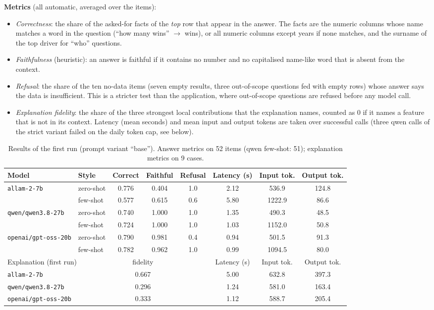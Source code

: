 \documentclass[10pt,a4paper]{article}
\newcommand{\code}[1]{\texttt{#1}}
\begin{document}
\textbf{Metrics} (all automatic, averaged over the items):
\begin{itemize}
\item \emph{Correctness}: the share of the asked-for facts of the \emph{top} row that appear in the answer. The facts are the numeric columns whose name matches a word in the question (``how many wins'' $\rightarrow$ wins), or all numeric columns except years if none matches, and the surname of the top driver for ``who'' questions.
\item \emph{Faithfulness} (heuristic): an answer is faithful if it contains no number and no capitalised name-like word that is absent from the context.
\item \emph{Refusal}: the share of the ten no-data items (seven empty results, three out-of-scope questions fed with empty rows) whose answer says the data is insufficient. This is a stricter test than the application, where out-of-scope questions are refused before any model call.
\item \emph{Explanation fidelity}: the share of the three strongest local contributions that the explanation names, counted as 0 if it names a feature that is not in its context. Latency (mean seconds) and mean input and output tokens are taken over successful calls (three qwen calls of the strict variant failed on the daily token cap, see below).
\end{itemize}

\begin{table}[H]
\centering\small
\caption{Results of the first run (prompt variant ``base''). Answer metrics on 52 items (qwen few-shot: 51); explanation metrics on 9 cases.}\label{tab:llm}
\begin{tabular}{llcccccc}
\toprule
Model & Style & Correct & Faithful & Refusal & Latency (s) & Input tok. & Output tok. \\
\midrule
\code{allam-2-7b} & zero-shot & 0.776 & 0.404 & 1.0 & 2.12 & 536.9 & 124.8 \\
 & few-shot & 0.577 & 0.615 & 0.6 & 5.80 & 1222.9 & 86.6 \\
\code{qwen/qwen3.8-27b} & zero-shot & 0.740 & 1.000 & 1.0 & 1.35 & 490.3 & 48.5 \\
 & few-shot & 0.724 & 1.000 & 1.0 & 1.03 & 1152.0 & 50.8 \\
\code{openai/gpt-oss-20b} & zero-shot & 0.790 & 0.981 & 0.4 & 0.94 & 501.5 & 91.3 \\
 & few-shot & 0.782 & 0.962 & 1.0 & 0.99 & 1094.5 & 80.0 \\
\midrule
\multicolumn{2}{l}{Explanation (first run)} & \multicolumn{2}{c}{fidelity} & & Latency (s) & Input tok. & Output tok. \\
\code{allam-2-7b} & & \multicolumn{2}{c}{0.667} & & 5.00 & 632.8 & 397.3 \\
\code{qwen/qwen3.8-27b} & & \multicolumn{2}{c}{0.296} & & 1.24 & 581.0 & 163.4 \\
\code{openai/gpt-oss-20b} & & \multicolumn{2}{c}{0.333} & & 1.12 & 588.7 & 205.4 \\
\bottomrule
\end{tabular}
\end{table}
\end{document}
